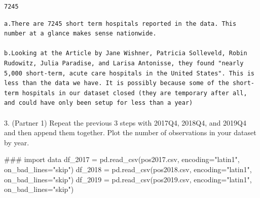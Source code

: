 \documentclass[
  letterpaper,
  DIV=11,
  numbers=noendperiod]{scrartcl}
\makeatletter
\let\oldparagraph\paragraph
\renewcommand{\paragraph}{
    \@ifstar
      \xxxParagraphStar
      \xxxParagraphNoStar
  }
\newcommand{\xxxParagraphStar}[1]{\oldparagraph*{#1}\mbox{}}
\newcommand{\xxxParagraphNoStar}[1]{\oldparagraph{#1}\mbox{}}
\newenvironment{Shaded}{\begin{snugshade}}{\end{snugshade}}
\newcommand{\CommentTok}[1]{\textcolor[rgb]{0.37,0.37,0.37}{#1}}
\newcommand{\NormalTok}[1]{\textcolor[rgb]{0.00,0.23,0.31}{#1}}
\newcommand{\OperatorTok}[1]{\textcolor[rgb]{0.37,0.37,0.37}{#1}}
\newcommand{\StringTok}[1]{\textcolor[rgb]{0.13,0.47,0.30}{#1}}
\makeatother
\begin{document}
\begin{verbatim}
7245
\end{verbatim}

\begin{verbatim}
a.There are 7245 short term hospitals reported in the data. This number at a glance makes sense nationwide.

b.Looking at the Article by Jane Wishner, Patricia Solleveld, Robin Rudowitz, Julia Paradise, and Larisa Antonisse, they found "nearly 5,000 short-term, acute care hospitals in the United States". This is less than the data we have. It is possibly because some of the short-term hospitals in our dataset closed (they are temporary after all, and could have only been setup for less than a year)
\end{verbatim}

\paragraph{3. (Partner 1) Repeat the previous 3 steps with 2017Q4,
2018Q4, and 2019Q4 and then append them together. Plot the number of
observations in your dataset by
year.}\label{partner-1-repeat-the-previous-3-steps-with-2017q4-2018q4-and-2019q4-and-then-append-them-together.-plot-the-number-of-observations-in-your-dataset-by-year.}

\begin{Shaded}
\begin{Highlighting}[]
\CommentTok{\#\#\# import data }
\NormalTok{df\_2017 }\OperatorTok{=}\NormalTok{ pd.read\_csv(}\StringTok{\textquotesingle{}pos2017.csv\textquotesingle{}}\NormalTok{, encoding}\OperatorTok{=}\StringTok{"latin1"}\NormalTok{, on\_bad\_lines}\OperatorTok{=}\StringTok{"skip"}\NormalTok{)}
\NormalTok{df\_2018 }\OperatorTok{=}\NormalTok{ pd.read\_csv(}\StringTok{\textquotesingle{}pos2018.csv\textquotesingle{}}\NormalTok{, encoding}\OperatorTok{=}\StringTok{"latin1"}\NormalTok{, on\_bad\_lines}\OperatorTok{=}\StringTok{"skip"}\NormalTok{)}
\NormalTok{df\_2019 }\OperatorTok{=}\NormalTok{ pd.read\_csv(}\StringTok{\textquotesingle{}pos2019.csv\textquotesingle{}}\NormalTok{, encoding}\OperatorTok{=}\StringTok{"latin1"}\NormalTok{, on\_bad\_lines}\OperatorTok{=}\StringTok{"skip"}\NormalTok{)}
\end{Highlighting}
\end{Shaded}
\end{document}
